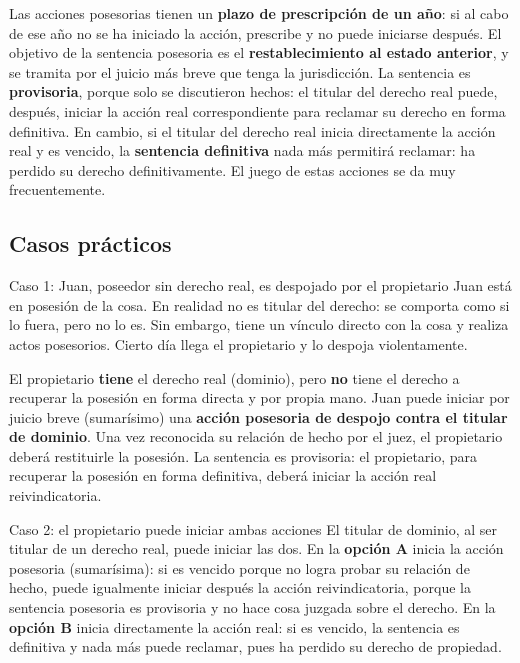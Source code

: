 \documentclass[12pt,oneside]{book}
\begin{document}
Las acciones posesorias tienen un \textbf{plazo de prescripción de un año}: si al cabo de ese año no se ha iniciado la acción, prescribe y no puede iniciarse después. El objetivo de la sentencia posesoria es el \textbf{restablecimiento al estado anterior}, y se tramita por el juicio más breve que tenga la jurisdicción. La sentencia es \textbf{provisoria}, porque solo se discutieron hechos: el titular del derecho real puede, después, iniciar la acción real correspondiente para reclamar su derecho en forma definitiva. En cambio, si el titular del derecho real inicia directamente la acción real y es vencido, la \textbf{sentencia definitiva} nada más permitirá reclamar: ha perdido su derecho definitivamente. El juego de estas acciones se da muy frecuentemente.

\subsection{Casos prácticos}

\begin{ejemplo}{Caso 1: Juan, poseedor sin derecho real, es despojado por el propietario}
Juan está en posesión de la cosa. En realidad no es titular del derecho: se comporta como si lo fuera, pero no lo es. Sin embargo, tiene un vínculo directo con la cosa y realiza actos posesorios. Cierto día llega el propietario y lo despoja violentamente.

El propietario \textbf{tiene} el derecho real (dominio), pero \textbf{no} tiene el derecho a recuperar la posesión en forma directa y por propia mano. Juan puede iniciar por juicio breve (sumarísimo) una \textbf{acción posesoria de despojo contra el titular de dominio}. Una vez reconocida su relación de hecho por el juez, el propietario deberá restituirle la posesión. La sentencia es provisoria: el propietario, para recuperar la posesión en forma definitiva, deberá iniciar la acción real reivindicatoria.
\end{ejemplo}

\begin{ejemplo}{Caso 2: el propietario puede iniciar ambas acciones}
El titular de dominio, al ser titular de un derecho real, puede iniciar las dos. En la \textbf{opción A} inicia la acción posesoria (sumarísima): si es vencido porque no logra probar su relación de hecho, puede igualmente iniciar después la acción reivindicatoria, porque la sentencia posesoria es provisoria y no hace cosa juzgada sobre el derecho. En la \textbf{opción B} inicia directamente la acción real: si es vencido, la sentencia es definitiva y nada más puede reclamar, pues ha perdido su derecho de propiedad.
\end{ejemplo}
\end{document}
